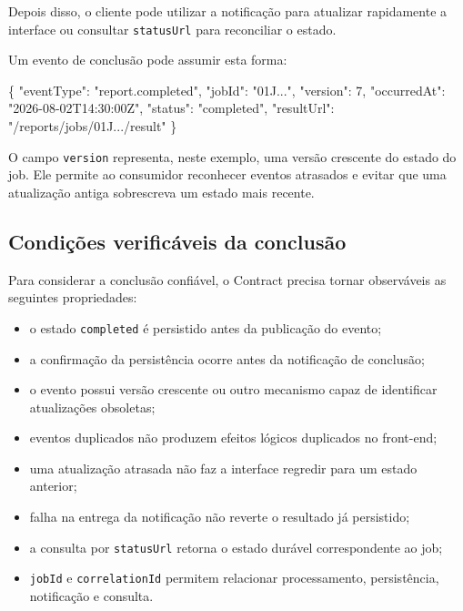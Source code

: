 \documentclass[
  10pt,
  a4paper,
  oneside]{book}
\newenvironment{Shaded}{}{}
\newcommand{\DataTypeTok}[1]{\textcolor[rgb]{0.56,0.13,0.00}{#1}}
\newcommand{\DecValTok}[1]{\textcolor[rgb]{0.25,0.63,0.44}{#1}}
\newcommand{\FunctionTok}[1]{\textcolor[rgb]{0.02,0.16,0.49}{#1}}
\newcommand{\StringTok}[1]{\textcolor[rgb]{0.25,0.44,0.63}{#1}}
\providecommand{\tightlist}{%
  \setlength{\itemsep}{0pt}\setlength{\parskip}{0pt}}
\renewenvironment{Shaded}{\begin{snugshade}}{\end{snugshade}}%
\begin{document}
Depois disso, o cliente pode utilizar a notificação para atualizar
rapidamente a interface ou consultar \texttt{statusUrl} para reconciliar
o estado.

Um evento de conclusão pode assumir esta forma:

\begin{Shaded}
\begin{Highlighting}[]
\FunctionTok{\{}
  \DataTypeTok{"eventType"}\FunctionTok{:} \StringTok{"report.completed"}\FunctionTok{,}
  \DataTypeTok{"jobId"}\FunctionTok{:} \StringTok{"01J..."}\FunctionTok{,}
  \DataTypeTok{"version"}\FunctionTok{:} \DecValTok{7}\FunctionTok{,}
  \DataTypeTok{"occurredAt"}\FunctionTok{:} \StringTok{"2026{-}08{-}02T14:30:00Z"}\FunctionTok{,}
  \DataTypeTok{"status"}\FunctionTok{:} \StringTok{"completed"}\FunctionTok{,}
  \DataTypeTok{"resultUrl"}\FunctionTok{:} \StringTok{"/reports/jobs/01J.../result"}
\FunctionTok{\}}
\end{Highlighting}
\end{Shaded}

O campo \texttt{version} representa, neste exemplo, uma versão crescente
do estado do job. Ele permite ao consumidor reconhecer eventos atrasados
e evitar que uma atualização antiga sobrescreva um estado mais recente.

\hypertarget{condiuxe7uxf5es-verificuxe1veis-da-conclusuxe3o}{%
\subsection{Condições verificáveis da
conclusão}\label{condiuxe7uxf5es-verificuxe1veis-da-conclusuxe3o}}

Para considerar a conclusão confiável, o Contract precisa tornar
observáveis as seguintes propriedades:

\begin{itemize}
\tightlist
\item
  o estado \texttt{completed} é persistido antes da publicação do
  evento;
\item
  a confirmação da persistência ocorre antes da notificação de
  conclusão;
\item
  o evento possui versão crescente ou outro mecanismo capaz de
  identificar atualizações obsoletas;
\item
  eventos duplicados não produzem efeitos lógicos duplicados no
  front-end;
\item
  uma atualização atrasada não faz a interface regredir para um estado
  anterior;
\item
  falha na entrega da notificação não reverte o resultado já persistido;
\item
  a consulta por \texttt{statusUrl} retorna o estado durável
  correspondente ao job;
\item
  \texttt{jobId} e \texttt{correlationId} permitem relacionar
  processamento, persistência, notificação e consulta.
\end{itemize}
\end{document}
